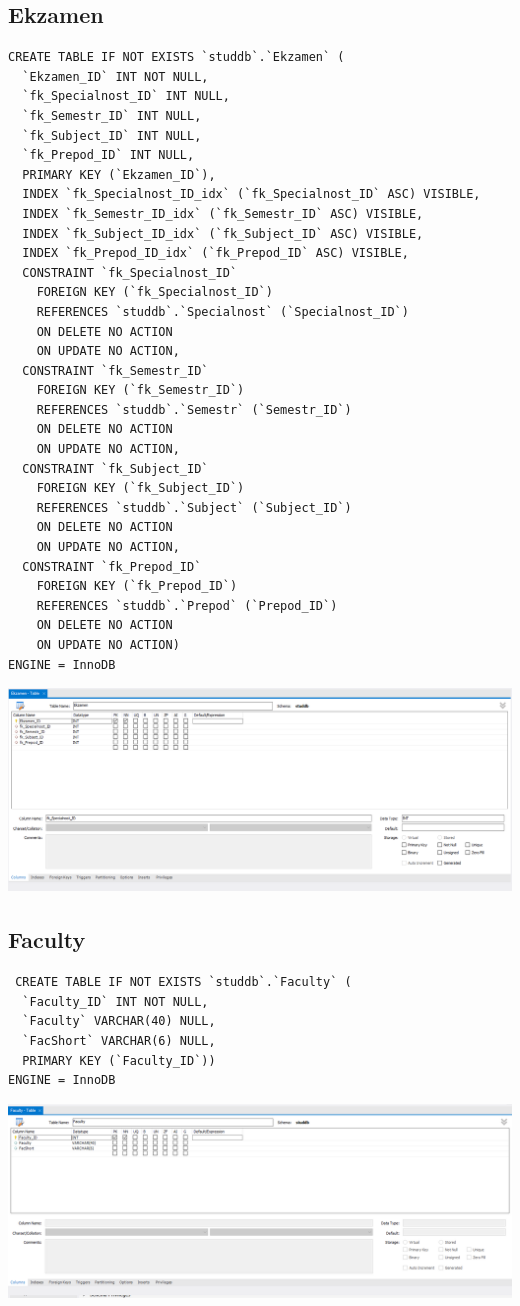 \documentclass[a4paper, 12pt]{article}
\begin{document}
\subsection{Ekzamen}
\begin{lstlisting}
CREATE TABLE IF NOT EXISTS `studdb`.`Ekzamen` (
  `Ekzamen_ID` INT NOT NULL,
  `fk_Specialnost_ID` INT NULL,
  `fk_Semestr_ID` INT NULL,
  `fk_Subject_ID` INT NULL,
  `fk_Prepod_ID` INT NULL,
  PRIMARY KEY (`Ekzamen_ID`),
  INDEX `fk_Specialnost_ID_idx` (`fk_Specialnost_ID` ASC) VISIBLE,
  INDEX `fk_Semestr_ID_idx` (`fk_Semestr_ID` ASC) VISIBLE,
  INDEX `fk_Subject_ID_idx` (`fk_Subject_ID` ASC) VISIBLE,
  INDEX `fk_Prepod_ID_idx` (`fk_Prepod_ID` ASC) VISIBLE,
  CONSTRAINT `fk_Specialnost_ID`
    FOREIGN KEY (`fk_Specialnost_ID`)
    REFERENCES `studdb`.`Specialnost` (`Specialnost_ID`)
    ON DELETE NO ACTION
    ON UPDATE NO ACTION,
  CONSTRAINT `fk_Semestr_ID`
    FOREIGN KEY (`fk_Semestr_ID`)
    REFERENCES `studdb`.`Semestr` (`Semestr_ID`)
    ON DELETE NO ACTION
    ON UPDATE NO ACTION,
  CONSTRAINT `fk_Subject_ID`
    FOREIGN KEY (`fk_Subject_ID`)
    REFERENCES `studdb`.`Subject` (`Subject_ID`)
    ON DELETE NO ACTION
    ON UPDATE NO ACTION,
  CONSTRAINT `fk_Prepod_ID`
    FOREIGN KEY (`fk_Prepod_ID`)
    REFERENCES `studdb`.`Prepod` (`Prepod_ID`)
    ON DELETE NO ACTION
    ON UPDATE NO ACTION)
ENGINE = InnoDB  
\end{lstlisting}
\includegraphics[width=\textwidth]{2-4.png}

\subsection{Faculty}
\begin{lstlisting}
 CREATE TABLE IF NOT EXISTS `studdb`.`Faculty` (
  `Faculty_ID` INT NOT NULL,
  `Faculty` VARCHAR(40) NULL,
  `FacShort` VARCHAR(6) NULL,
  PRIMARY KEY (`Faculty_ID`))
ENGINE = InnoDB 
\end{lstlisting}
\includegraphics[width=\textwidth]{2-5.png}
\end{document}
